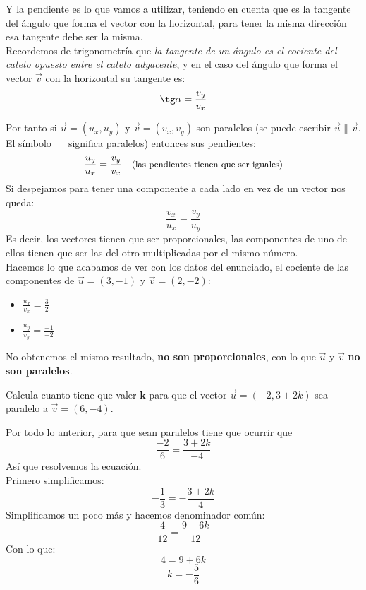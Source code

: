 \documentclass[a4paper,11pt,answers]{exam}
\begin{document}
\begin{questions}
\begin{solution}
    
    Y la pendiente es lo que vamos a utilizar, teniendo en cuenta que  es la tangente del
    ángulo que forma el vector con la horizontal, para tener la misma dirección esa tangente debe
    ser la misma.\\
    Recordemos de trigonometría que \emph{la tangente de un ángulo es el cociente del cateto opuesto
      entre el cateto adyacente}, y en el caso del ángulo que forma el vector $\vec{v}$
    con la horizontal su tangente es:
    \[\tg \alpha = \frac{v_y}{v_x}\]

    Por tanto si $\vec{u} = (u_x, u_y)$ y $\vec{v}= (v_x, v_y)$ son paralelos (se puede
    escribir $\vec{u} \parallel \vec{v}$. El símbolo $\boldsymbol{\parallel}$ significa paralelos) entonces sus pendientes:
    \[\frac{u_y}{u_x} = \frac{v_y}{v_x}\quad\text{\small{(las pendientes tienen que ser iguales)}}\]
    Si despejamos para tener una componente a cada lado en vez de un vector nos queda:
    \[\frac{v_x}{u_x} = \frac{v_y}{u_y}\]
    Es decir, los vectores tienen que ser proporcionales, las componentes de uno de ellos tienen
    que ser las del otro multiplicadas por el mismo número.\\
    
    Hacemos lo que acabamos de ver con los datos del enunciado, el cociente de las componentes
    de $\vec{u} = (3, -1)$ y $\vec{v} = (2, -2)$:
    \begin{itemize}
    \item $\frac{u_x}{v_x} = \frac{3}{2}$
    \item $\frac{u_y}{v_y} = \frac{-1}{-2}$
    \end{itemize}
    No obtenemos el mismo resultado, \textbf{no son proporcionales}, con lo que
    $\vec{u}$ y $\vec{v}$ \textbf{no son paralelos}.
  \end{solution}
\question Calcula cuanto tiene que valer $\boldsymbol{k}$ para que el vector $\vec{u} = (-2, 3+2k)$
  sea paralelo a $\vec{v} = (6, -4)$.
  \begin{solution}
    Por todo lo anterior, para que sean paralelos tiene que ocurrir que
    \[\frac{-2}{6} = \frac{3+2k}{-4}\]
    Así que resolvemos la ecuación.\\
    Primero simplificamos:
    \[-\frac{1}{3} = -\frac{3+2k}{4}\]
    Simplificamos un poco más y hacemos denominador común:
    \[\frac{4}{12} = \frac{9+6k}{12}\]
    Con lo que:
    \[4 = 9 + 6k\]
    \[k = -\frac{5}{6}\]


\end{solution}
\end{questions}
\end{document}
